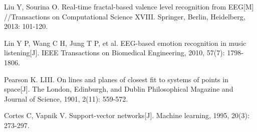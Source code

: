 \documentclass[runningheads,a4paper]{llncs}
\begin{document}
\begin{thebibliography}{4}
 Liu Y, Sourina O.
Real-time fractal-based valence level recognition from EEG[M]
//Transactions on Computational Science XVIII. Springer, Berlin, Heidelberg, 2013: 101-120.

 Lin Y P, Wang C H, Jung T P, et al.
 EEG-based emotion recognition in music listening[J].
 IEEE Transactions on Biomedical Engineering, 2010, 57(7): 1798-1806.

  Pearson K. LIII.
 On lines and planes of closest fit to systems of points in space[J].
 The London, Edinburgh, and Dublin Philosophical Magazine and Journal of Science, 1901, 2(11): 559-572.

 Cortes C, Vapnik V.
Support-vector networks[J].
Machine learning, 1995, 20(3): 273-297.
\end{thebibliography}
\end{document}
